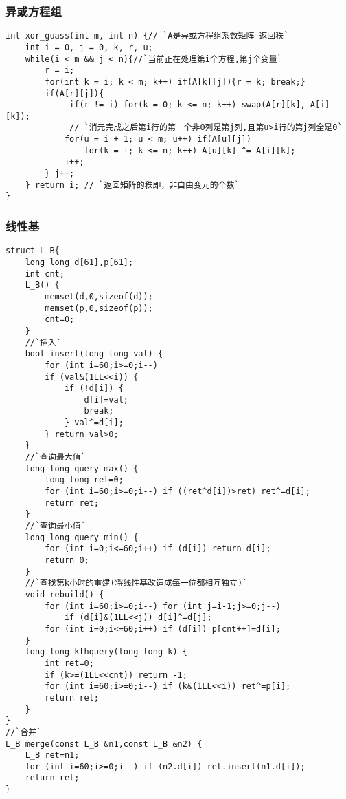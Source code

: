 \subsubsection{异或方程组}
\begin{lstlisting}
int xor_guass(int m, int n) {// `A是异或方程组系数矩阵 返回秩`
    int i = 0, j = 0, k, r, u;
    while(i < m && j < n){//`当前正在处理第i个方程,第j个变量`
        r = i;
        for(int k = i; k < m; k++) if(A[k][j]){r = k; break;}
        if(A[r][j]){
             if(r != i) for(k = 0; k <= n; k++) swap(A[r][k], A[i][k]);
             // `消元完成之后第i行的第一个非0列是第j列,且第u>i行的第j列全是0`
            for(u = i + 1; u < m; u++) if(A[u][j])
                for(k = i; k <= n; k++) A[u][k] ^= A[i][k];
            i++;
        } j++;
    } return i; // `返回矩阵的秩即，非自由变元的个数`
}
\end{lstlisting}

\subsubsection{线性基}
\begin{lstlisting}
struct L_B{
	long long d[61],p[61];
	int cnt;
	L_B() {
		memset(d,0,sizeof(d));
		memset(p,0,sizeof(p));
		cnt=0;
	}
	//`插入`
	bool insert(long long val) {
		for (int i=60;i>=0;i--)
		if (val&(1LL<<i)) {
			if (!d[i]) {
				d[i]=val;
				break;
			} val^=d[i];
		} return val>0;
	}
	//`查询最大值`
	long long query_max() {
		long long ret=0;
		for (int i=60;i>=0;i--) if ((ret^d[i])>ret) ret^=d[i];
		return ret;
	}
	//`查询最小值`
	long long query_min() {
		for (int i=0;i<=60;i++) if (d[i]) return d[i];
		return 0;
	}
	//`查找第k小时的重建(将线性基改造成每一位都相互独立)`
	void rebuild() {
		for (int i=60;i>=0;i--) for (int j=i-1;j>=0;j--)
		    if (d[i]&(1LL<<j)) d[i]^=d[j];
		for (int i=0;i<=60;i++) if (d[i]) p[cnt++]=d[i];
	}
	long long kthquery(long long k) {
		int ret=0;
		if (k>=(1LL<<cnt)) return -1;
		for (int i=60;i>=0;i--) if (k&(1LL<<i)) ret^=p[i];
		return ret;
	}
}
//`合并`
L_B merge(const L_B &n1,const L_B &n2) {
	L_B ret=n1;
	for (int i=60;i>=0;i--) if (n2.d[i]) ret.insert(n1.d[i]);
	return ret;
}
\end{lstlisting}


